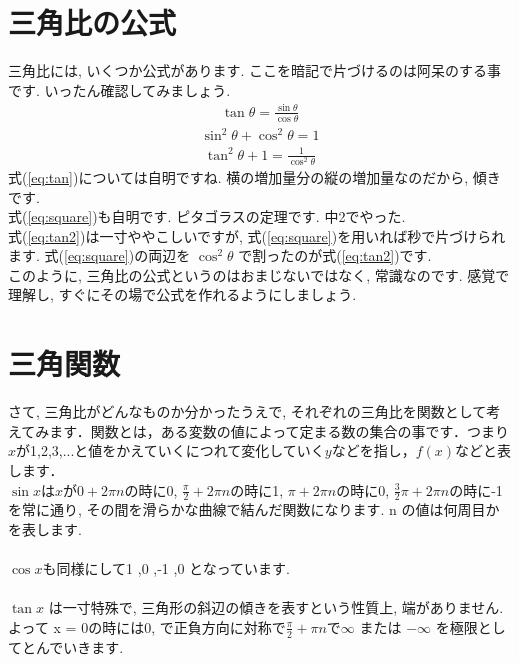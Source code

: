 \documentclass[11pt,a4paper]{jreport}
\begin{document}
\section{三角比の公式}
三角比には, いくつか公式があります. ここを暗記で片づけるのは阿呆のする事です. いったん確認してみましょう.
\begin{eqnarray}
\tan \theta = \frac{\sin\theta}{\cos\theta}
\label{eq:tan}
\end{eqnarray}
\begin{eqnarray}
\sin^2 \theta + \cos^2\theta = 1
\label{eq:square}
\end{eqnarray}
\begin{eqnarray}
\tan^2\theta + 1 = \frac{1}{\cos^2\theta}
\label{eq:tan2}
\end{eqnarray}
式(\ref{eq:tan})については自明ですね. 横の増加量分の縦の増加量なのだから, 傾きです.\\

式(\ref{eq:square})も自明です. ピタゴラスの定理です. 中2でやった. \\

式(\ref{eq:tan2})は一寸ややこしいですが, 式(\ref{eq:square})を用いれば秒で片づけられます. 式(\ref{eq:square})の両辺を $\cos^2\theta$ で割ったのが式(\ref{eq:tan2})です.\\

このように, 三角比の公式というのはおまじないではなく, 常識なのです. 感覚で理解し, すぐにその場で公式を作れるようにしましょう. 


\section{三角関数}
さて, 三角比がどんなものか分かったうえで, それぞれの三角比を関数として考えてみます．関数とは，ある変数の値によって定まる数の集合の事です．つまり$x$が1,2,3,...と値をかえていくにつれて変化していく$y$などを指し，$f(x)$などと表します．\\

 $\sin x $は$x$が$0 + 2\pi n$の時に0, $\frac{\pi}{2} + 2\pi n$の時に1, $\pi + 2\pi n$の時に0, $\frac{3}{2}\pi + 2\pi n$の時に-1を常に通り, その間を滑らかな曲線で結んだ関数になります. n の値は何周目かを表します.\\
\\
$\cos x $も同様にして1 ,0 ,-1 ,0 となっています. \\
\\
$\tan x$ は一寸特殊で, 三角形の斜辺の傾きを表すという性質上, 端がありません. よって x = 0の時には0, で正負方向に対称で$\frac{\pi}{2} + \pi n$で$\infty$ または $-\infty$ を極限としてとんでいきます.\\
\end{document}
